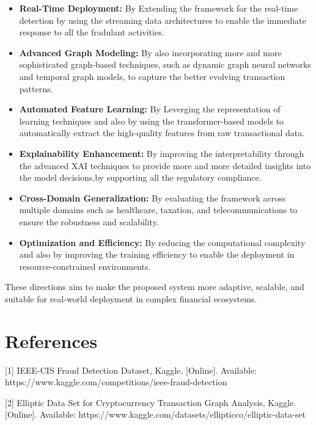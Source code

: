 \documentclass[conference]{IEEEtran}
\begin{document}
\begin{itemize}
    \item \textbf{Real-Time Deployment:}  
    By Extending the framework for the real-time detection by using the streaming data architectures to enable the  immediate response to all the fradulant activities.

    \item \textbf{Advanced Graph Modeling:}  
    By also incorporating more  and more sophisticated graph-based techniques, such as dynamic graph neural networks and temporal graph models, to capture the better evolving transaction patterns. 

    \item \textbf{Automated Feature Learning:} 
    By Leverging  the  representation of learning techniques and also by using the transformer-based models to automatically extract the high-quality features from raw transactional data.
   

    \item \textbf{Explainability Enhancement:} 
    By improving the interpretability through the advanced XAI techniques to provide more and more detailed insights into the model decisions,by supporting all the  regulatory compliance. 
   
    \item \textbf{Cross-Domain Generalization:}  
    By evaluating the framework across multiple domains such as  healthcare, taxation, and telecommunications to ensure the robustness and scalability.


    \item \textbf{Optimization and Efficiency:}  
    By reducing the computational complexity and also by improving the training efficiency to enable the deployment in resource-constrained environments.
   
\end{itemize}

These directions aim to make the proposed system more adaptive, scalable, and suitable for real-world deployment in complex financial ecosystems.

\section{References}

[1] IEEE-CIS Fraud Detection Dataset, Kaggle. [Online]. Available: https://www.kaggle.com/competitions/ieee-fraud-detection

[2] Elliptic Data Set for Cryptocurrency Transaction Graph Analysis, Kaggle. [Online]. Available: https://www.kaggle.com/datasets/ellipticco/elliptic-data-set
\end{document}
